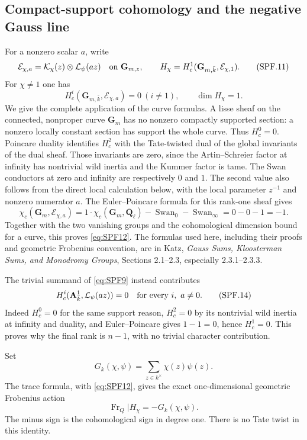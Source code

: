 \subsection{Compact-support cohomology and the negative Gauss line}

For a nonzero scalar \(a\), write
\[
 \mathcal E_{\chi,a}=
       \mathcal K_\chi(z)\otimes\mathcal L_\psi(az)
       \quad\hbox{on }\mathbf G_{m,z},\qquad
 H_\chi=H_c^1(\mathbf G_{m,\bar k},\mathcal E_{\chi,1}).
 \tag{SPF.11}\label{eq:SPF11}
\]
For \(\chi\ne1\) one has
\[
 H_c^i(\mathbf G_{m,\bar k},\mathcal E_{\chi,a})=0
       \ (i\ne1),\qquad
 \dim H_\chi=1.
 \tag{SPF.12}\label{eq:SPF12}
\]
We give the complete application of the curve formulas. A lisse
sheaf on the connected, nonproper curve \(\mathbf G_m\) has no
nonzero compactly supported section: a nonzero locally constant
section has support the whole curve. Thus \(H_c^0=0\).
Poincare duality identifies \(H_c^2\) with the Tate-twisted dual
of the global invariants of the dual sheaf. Those invariants
are zero, since the Artin--Schreier factor at infinity has
nontrivial wild inertia and the Kummer factor is tame.
The Swan conductors at zero and infinity are respectively \(0\)
and \(1\). The second value also follows from the direct local
calculation below, with the local parameter \(z^{-1}\) and
nonzero numerator \(a\). The Euler--Poincare formula for this
rank-one sheaf gives
\[
 \chi_c(\mathbf G_m,\mathcal E_{\chi,a})
  =1\cdot\chi_c(\mathbf G_m,\overline{\mathbf Q}_\ell)
        -\operatorname{Swan}_0-\operatorname{Swan}_\infty
  =0-0-1=-1.
 \tag{SPF.13}\label{eq:SPF13}
\]
Together with the two vanishing groups and the cohomological
dimension bound for a curve, this proves \eqref{eq:SPF12}.
The formulas used here, including their proofs and geometric
Frobenius convention, are in Katz,
\emph{Gauss Sums, Kloosterman Sums, and Monodromy Groups},
Sections 2.1--2.3, especially 2.3.1--2.3.3.

The trivial summand of \eqref{eq:SPF9} instead contributes
\[
 H_c^i(\mathbf A^1_{\bar k},\mathcal L_\psi(az))=0
                       \quad\hbox{for every }i,\ a\ne0.
 \tag{SPF.14}\label{eq:SPF14}
\]
Indeed \(H_c^0=0\) for the same support reason, \(H_c^2=0\)
by its nontrivial wild inertia at infinity and duality, and
Euler--Poincare gives \(1-1=0\), hence \(H_c^1=0\).
This proves why the final rank is \(n-1\), with no trivial
character contribution.

Set
\[
 G_k(\chi,\psi)=\sum_{z\in k^\times}\chi(z)\psi(z).
 \tag{SPF.15}\label{eq:SPF15}
\]
The trace formula, with \eqref{eq:SPF12}, gives the exact
one-dimensional geometric Frobenius action
\[
 \operatorname{Fr}_Q\big|H_\chi
       =-G_k(\chi,\psi).
 \tag{SPF.16}\label{eq:SPF16}
\]
The minus sign is the cohomological sign in degree one.
There is no Tate twist in this identity.

